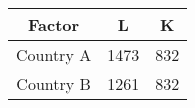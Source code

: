 \begin{table}[ht]
    \centering
    \begin{tabular}{|c|c|c|}
    \hline
    Factor & L & K \\
    \hline
    Country A & 1473 & 832 \\
    \hline
    Country B & 1261 & 832 \\
    \hline
    \end{tabular}
\end{table}